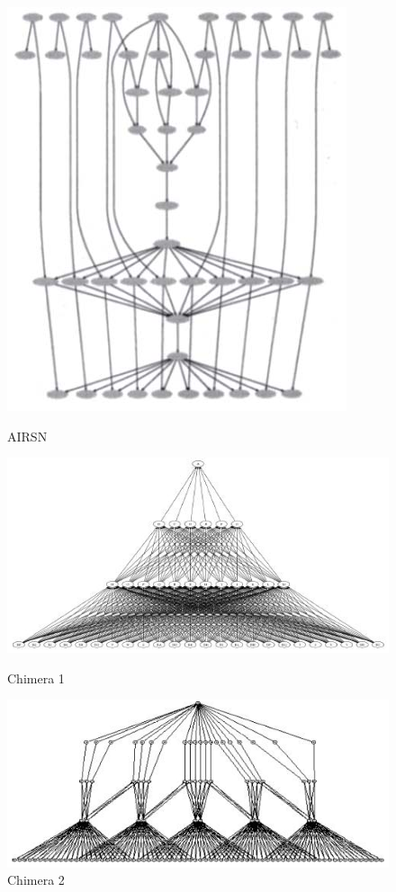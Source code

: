 \documentclass[a4paper,10pt]{article}
\begin{document}
\begin{figure}[!htb]

\centering
\includegraphics[scale=.25]{figures/airsn.png}
\caption{AIRSN \protect\cite{bit}}
\label{airsn}

\centering
\includegraphics[scale=.25]{figures/chimera1.png}
\caption{Chimera 1 \protect\cite{bit}}
\label{chimera1}

\centering
\includegraphics[scale=.25]{figures/chimera2.png}
\caption{Chimera 2 \protect\cite{bit}}
\label{chimera2}


\end{figure}
\end{document}
